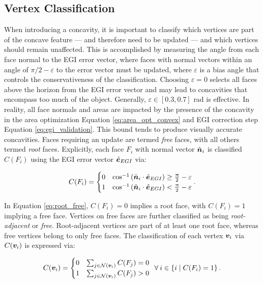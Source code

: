 \subsection{Vertex Classification}

When introducing a concavity, it is important to classify which vertices are part of the concave feature --- and therefore need to be updated --- and which vertices should remain unaffected. This is accomplished by measuring the angle from each face normal to the EGI error vector, where faces with normal vectors within an angle of $\pi/2 - \varepsilon$ to the error vector must be updated, where $\varepsilon$ is a bias angle that controls the conservativeness of the classification. Choosing $\varepsilon=0$ selects all faces above the horizon from the EGI error vector and may lead to concavities that encompass too much of the object. Generally, $\varepsilon \in [0.3, 0.7]$ rad is effective. In reality, all face normals and areas are impacted by the presence of the concavity in the area optimization Equation \ref{eq:area_opt_convex} and EGI correction step Equation \ref{eq:egi_validation}. This bound tends to produce visually accurate concavities. Faces requiring an update are termed \textit{free} faces, with all others termed \textit{root} faces. Explicitly, each face $F_i$ with normal vector $\hat{\bm{n}}_i$ is classified $C(F_i)$ using the EGI error vector $\hat{\bm{e}}_{EGI}$ via:

\begin{equation} \label{eq:root_free}
  C(F_i) = \begin{cases} 
    0 & \cos^{-1}\left( \hat{\bm{n}}_i \cdot \hat{\bm{e}}_{EGI} \right) \geq \frac{\uppi}{2} - \varepsilon \\
    1 & \cos^{-1}\left( \hat{\bm{n}}_i \cdot \hat{\bm{e}}_{EGI} \right) < \frac{\uppi}{2} - \varepsilon \\
  \end{cases}.
\end{equation}

In Equation \ref{eq:root_free}, $C(F_i) = 0$ implies a root face, with $C(F_i) = 1$ implying a free face. Vertices on free faces are further classified as being \textit{root-adjacent} or \textit{free}. Root-adjacent vertices are part of at least one root face, whereas free vertices belong to only free faces. The classification of each vertex $\bm{v}_i$ via $C(\bm{v}_i)$ is expressed via:

\begin{equation} \label{eq:root_free_verts}
  C(\bm{v}_i) = \begin{cases}
    0 & \sum_{j \in \mathcal{N}(\bm{v}_i)}{C(F_j)} = 0 \\
    1 & \sum_{j \in \mathcal{N}(\bm{v}_i)}{C(F_j)} > 0 \\    
  \end{cases} \: \: \forall \: i \in \left\{ i \mid C(F_i) = 1 \right\}.
\end{equation}

